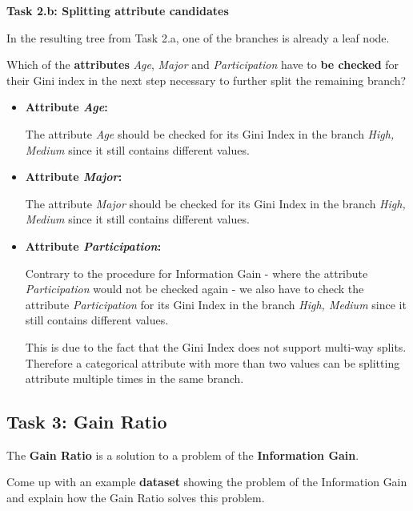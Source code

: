 \documentclass[
english,
smallborders
]{i6prcsht}
\begin{document}
\textbf{Task 2.b: Splitting attribute candidates}

In the resulting tree from Task 2.a, one of the branches is already a leaf node.

Which of the \textbf{attributes} \textit{Age}, \textit{Major} and \textit{Participation} have to \textbf{be checked} for their Gini index in the next step necessary to further split the remaining branch?

\begin{solution}	
	\begin{itemize}	
		\item \textbf{Attribute \textit{Age}:}
		      
		      The attribute \textit{Age} should be checked for its Gini Index in the branch \textit{High, Medium} since it still contains different values.
		      
		\item \textbf{Attribute \textit{Major}:}
		      
		      The attribute \textit{Major} should be checked for its Gini Index in the branch \textit{High, Medium} since it still contains different values.
		      
		\item \textbf{Attribute \textit{Participation}:}
		      
		      Contrary to the procedure for Information Gain - where the attribute \textit{Participation} would not be checked again - we also have to check the attribute \textit{Participation} for its Gini Index in the branch \textit{High, Medium} since it still contains different values.
		      
		      This is due to the fact that the Gini Index does not support multi-way splits. Therefore a categorical attribute with more than two values can be splitting attribute multiple times in the same branch.
		      
		      
	\end{itemize}
\end{solution}

\subsection*{Task 3: Gain Ratio}

The \textbf{Gain Ratio} is a solution to a problem of the \textbf{Information Gain}.

Come up with an example \textbf{dataset} showing the problem of the Information Gain and explain how the Gain Ratio solves this problem.
\end{document}
